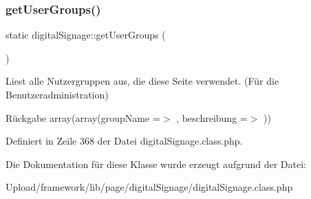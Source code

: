 \subsubsection{\texorpdfstring{get\+User\+Groups()}{getUserGroups()}}
{\footnotesize\ttfamily static digital\+Signage\+::get\+User\+Groups (\begin{DoxyParamCaption}{ }\end{DoxyParamCaption})\hspace{0.3cm}{\ttfamily [static]}}

Liest alle Nutzergruppen aus, die diese Seite verwendet. (Für die Benutzeradministration) \begin{DoxyReturn}{Rückgabe}
array(array(\textquotesingle{}group\+Name\textquotesingle{} =$>$ \textquotesingle{}\textquotesingle{}, \textquotesingle{}beschreibung\textquotesingle{} =$>$ \textquotesingle{}\textquotesingle{})) 
\end{DoxyReturn}


Definiert in Zeile 368 der Datei digital\+Signage.\+class.\+php.



Die Dokumentation für diese Klasse wurde erzeugt aufgrund der Datei\+:\begin{DoxyCompactItemize}
\item 
Upload/framework/lib/page/digital\+Signage/digital\+Signage.\+class.\+php\end{DoxyCompactItemize}
